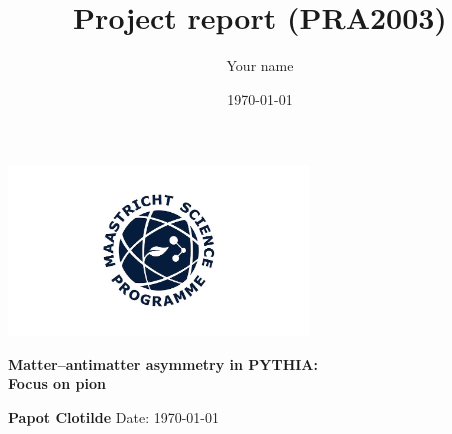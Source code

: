 \documentclass{article}
\title{Project report (PRA2003)}
\author{Your name}
\date{\today}
\begin{document}
\begin{titlepage}
    \begin{center}
        \includegraphics[width=8cm]{lab report/MSP-logo.jpg} 
        \vspace{1cm}
        
        \textbf{\LARGE Matter--antimatter asymmetry in PYTHIA:}\\
        \textbf{\LARGE Focus on pion\textbf{}}
        
        \vspace{1.5cm}
        
        \textbf{\Large Papot Clotilde}
        \vfill
        \large Date: \today
        
    \end{center}
\end{titlepage}

\newpage











\printbibliography
\end{document}

